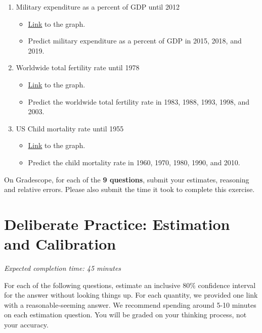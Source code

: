 \documentclass[11pt]{article}
\begin{document}
\begin{enumerate}
	\item Military expenditure as a percent of GDP until 2012
	\begin{itemize}
		\item \href{https://ourworldindata.org/grapher/military-expenditure-share-gdp-sipri?time=earliest..2012&country=~USA}{Link} to the graph.
		\item Predict military expenditure as a percent of GDP in 2015, 2018, and 2019.
	\end{itemize}

	\item Worldwide total fertility rate until 1978
	\begin{itemize}
		\item \href{https://ourworldindata.org/grapher/children-per-woman-UN?tab=chart&time=1950..1978}{Link} to the graph.
		\item Predict the worldwide total fertility rate in 1983, 1988, 1993, 1998, and 2003.
	\end{itemize}
	
	\item US Child mortality rate until 1955
	\begin{itemize}
		\item \href{https://ourworldindata.org/grapher/child-mortality?time=earliest..1955&country=~USA}{Link} to the graph.
		\item Predict the child mortality rate in 1960, 1970, 1980, 1990, and 2010.
	\end{itemize}
\end{enumerate}

On Gradescope, for each of the \textbf{9 questions}, submit your estimates, reasoning and relative errors. Please also submit the time it took to complete this exercise.

\section*{Deliberate Practice: Estimation and Calibration}

\emph{Expected completion time: 45 minutes}

For each of the following questions, estimate an inclusive $80\%$ confidence interval for the answer without looking things up. For each quantity, we provided one link with a reasonable-seeming answer. We recommend spending around 5-10 minutes on each estimation question. You will be graded on your thinking process, not your accuracy.
\end{document}
